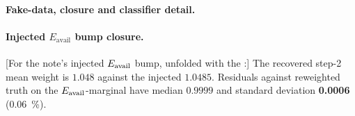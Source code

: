\paragraph{Fake-data, closure and classifier detail.}

\paragraph{Injected $E_{\mathrm{avail}}$ bump closure.} [For the note's injected $E_{\mathrm{avail}}$ bump, unfolded with the \estPurity{}:] The recovered step-2 mean weight is $1.048$ against the injected $1.0485$. Residuals against reweighted truth on the $E_{\mathrm{avail}}$-marginal have median $0.9999$ and standard deviation \textbf{\num{0.0006}} (\SI{0.06}{\percent}).

